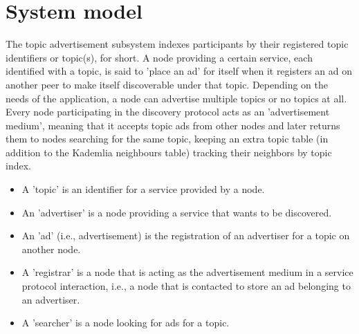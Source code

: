 \section{System model}

The topic advertisement subsystem indexes participants by their registered topic identifiers or topic(s), for short. A node providing a certain service, each identified with a topic, is said to 'place an ad' for itself when it registers an ad on another peer to make itself discoverable under that topic. Depending on the needs of the application, a node can advertise multiple topics or no topics at all. Every node participating in the discovery protocol acts as an 'advertisement medium', meaning that it accepts topic ads from other nodes and later returns them to nodes searching for the same topic, keeping an extra topic table (in addition to the Kademlia neighbours table) tracking their neighbors by topic index.

\begin{itemize}
    \item A 'topic' is an identifier for a service provided by a node.
    \item An 'advertiser' is a node providing a service that wants to be discovered.
    \item An 'ad' (i.e., advertisement) is the registration of an advertiser for a topic on another node.
    \item A 'registrar' is a node that is acting as the advertisement medium in a service protocol interaction, i.e., a node that is contacted to store an ad belonging to an advertiser.
    \item A 'searcher' is a node looking for ads for a topic.

\end{itemize}